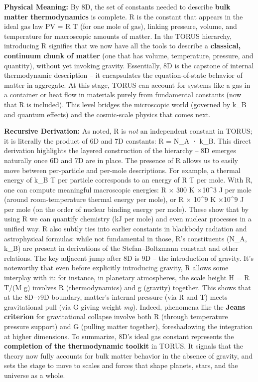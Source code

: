 \documentclass[
]{article}
\begin{document}
{\textbf{Physical Meaning:} By 8D, the set of constants needed to
describe \textbf{bulk matter thermodynamics} is complete. R is the
constant that appears in the ideal gas law PV = R T (for one mole of
gas), linking pressure, volume, and temperature for macroscopic amounts
of matter\hspace{0pt}. In the TORUS hierarchy, introducing R signifies
that we now have all the tools to describe a \textbf{classical,
continuum chunk of matter} (one that has volume, temperature, pressure,
and quantity), without yet invoking gravity. Essentially, 8D is the
capstone of internal thermodynamic description -- it encapsulates the
equation-of-state behavior of matter in aggregate. At this stage, TORUS
can account for systems like a gas in a container or heat flow in
materials purely from fundamental constants (now that R is included).
This level bridges the microscopic world (governed by k\_B and quantum
effects) and the cosmic-scale physics that comes next.

\textbf{Recursive Derivation:} As noted, R is \emph{not} an independent
constant in TORUS; it is literally the product of 6D and 7D constants: R
= N\_A · k\_B\hspace{0pt}. This direct derivation highlights the layered
construction of the hierarchy -- 8D emerges naturally once 6D and 7D are
in place. The presence of R allows us to easily move between
per-particle and per-mole descriptions. For example, a thermal energy of
k\_B T per particle corresponds to an energy of R T per mole. With R,
one can compute meaningful macroscopic energies: R × 300 K ×10\^{}3
J per mole (around room-temperature thermal energy per mole), or R ×
10\^{}9 K ×10\^{}9 J per mole (on the order of nuclear binding
energy per mole)\hspace{0pt}. These show that by using R we can quantify
chemistry (kJ per mole) and even nuclear processes in a unified way. R
also subtly ties into earlier constants in blackbody radiation and
astrophysical formulas: while not fundamental in those, R's constituents
(N\_A, k\_B) are present in derivations of the Stefan--Boltzmann
constant and other relations\hspace{0pt}. The key adjacent jump after 8D
is 9D -- the introduction of gravity. It's noteworthy that even before
explicitly introducing gravity, R allows some interplay with it: for
instance, in planetary atmospheres, the scale height H = R T/(M g)
involves R (thermodynamics) and g (gravity) together\hspace{0pt}. This
shows that at the 8D→9D boundary, matter's internal pressure (via R and
T) meets gravitational pull (via G giving weight \emph{mg}). Indeed,
phenomena like the \textbf{Jeans criterion} for gravitational collapse
involve both R (through temperature pressure support) and G (pulling
matter together), foreshadowing the integration at higher dimensions. To
summarize, 8D's ideal gas constant represents the \textbf{completion of
the thermodynamic toolkit} in TORUS. It signals that the theory now
fully accounts for bulk matter behavior in the absence of gravity, and
sets the stage to move to scales and forces that shape planets, stars,
and the universe as a whole.

}
\end{document}
